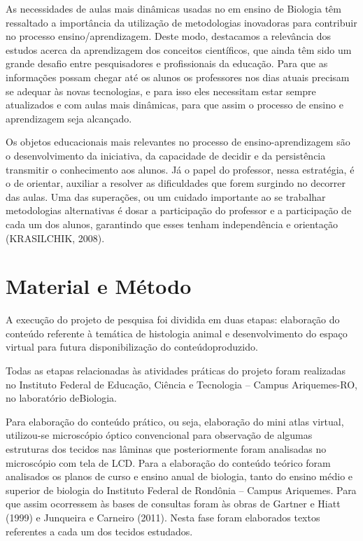 \documentclass[article,12pt,onesidea,4paper,english,brazil]{abntex2}
\begin{document}
	As necessidades de aulas mais dinâmicas usadas no em ensino de Biologia têm ressaltado a importância da utilização de metodologias inovadoras para contribuir no processo ensino/aprendizagem. Deste modo, destacamos a relevância dos estudos acerca da aprendizagem dos conceitos científicos, que ainda têm sido um grande desafio entre pesquisadores e profissionais da educação. Para que as informações possam chegar até os alunos os professores nos dias atuais precisam se adequar às novas tecnologias, e para isso eles necessitam estar sempre atualizados e com aulas mais dinâmicas, para que assim o processo de ensino e aprendizagem seja alcançado.
	
	Os objetos educacionais mais relevantes no processo de ensino-aprendizagem são o desenvolvimento da iniciativa, da capacidade de decidir e da persistência transmitir o conhecimento aos alunos. Já o papel do professor, nessa estratégia, é o de orientar, auxiliar a resolver as dificuldades que forem surgindo no decorrer das aulas. Uma das superações, ou um cuidado importante ao se trabalhar metodologias alternativas é dosar a participação do professor e a participação de cada um dos alunos, garantindo que esses tenham independência e orientação (KRASILCHIK, 2008).
	
	\section*{Material e Método}
	
	A execução do projeto de pesquisa foi dividida em duas etapas: elaboração do conteúdo referente à temática de histologia animal e desenvolvimento do espaço virtual para futura disponibilização do conteúdoproduzido.
	
	Todas as etapas relacionadas às atividades práticas do projeto foram realizadas no Instituto Federal de Educação, Ciência e Tecnologia – Campus Ariquemes-RO, no laboratório deBiologia.
	
	Para elaboração do conteúdo prático, ou seja, elaboração do mini atlas virtual, utilizou-se microscópio óptico convencional para observação de algumas estruturas dos tecidos nas lâminas que posteriormente foram analisadas no microscópio com tela de LCD. Para a elaboração do conteúdo teórico foram analisados os planos de curso e ensino anual de biologia, tanto do ensino médio e superior de biologia do Instituto Federal de Rondônia – Campus Ariquemes. Para que assim ocorressem às bases de consultas foram às obras de Gartner e Hiatt (1999) e Junqueira e Carneiro (2011). Nesta fase foram elaborados textos referentes a cada um dos tecidos estudados.
	
\end{document}
